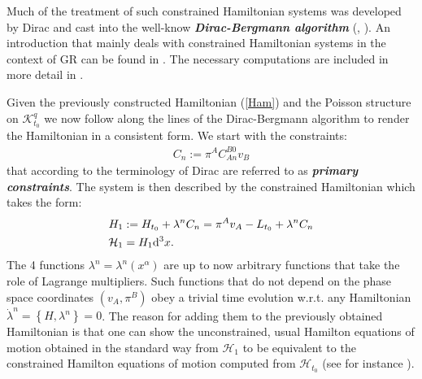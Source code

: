 Much of the treatment of such constrained Hamiltonian systems was developed by Dirac \cite{dirac_1950} and cast into the well-know \textit{\textbf{Dirac-Bergmann algorithm}} (\cite{PhysRev.83.1018}, \cite{doi:10.1063/1.523597}). An introduction that mainly deals with constrained Hamiltonian systems in the context of GR can be found in \cite{bojowald_2010}. The necessary computations are included in more detail in \cite{thiemann_2007}. 

Given the previously constructed Hamiltonian (\ref{Ham}) and the Poisson structure on $\mathcal{K}^q_{t_0}$ we now follow along the lines of the Dirac-Bergmann algorithm to render the Hamiltonian in a consistent form. We start with the constraints:
\begin{align}
C_n := \pi^A C_{An}^{B0}v_B
\end{align}
that according to the terminology of Dirac are referred to as \textbf{\textit{primary constraints}}. The system is then described by the constrained Hamiltonian which takes the form: 
\begin{align}
\begin{aligned}
H_1 &:= H_{t_0} + \lambda^n C_n = \pi^A v_A -L_{t_0} + \lambda^n C_n\\
\smallskip
\mathcal{H}_1 &= H_1 \mathrm{d}^3x.
\end{aligned}
\end{align}
The 4 functions $\lambda^n = \lambda^n(x^{\alpha})$ are up to now arbitrary functions that take the role of Lagrange multipliers. Such functions that do not depend on the phase space coordinates $(v_A, \pi^B)$ obey a trivial time evolution w.r.t. any Hamiltonian $\dot{\lambda}^n = \left \{H, \lambda^n \right \} = 0$. The reason for adding them to the previously obtained Hamiltonian is that one can show the unconstrained, usual Hamilton equations of motion obtained in the standard way from $\mathcal{H}_1$ to be equivalent to the constrained Hamilton equations of motion computed from $\mathcal{H}_{t_0}$ (see for instance \cite{bojowald_2010}).

